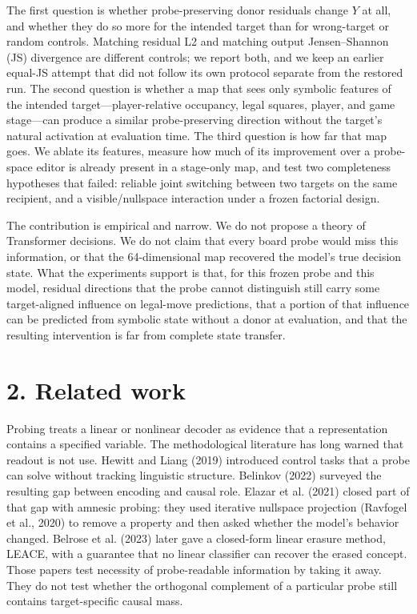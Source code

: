 \documentclass[11pt]{article}
\begin{document}
The first question is whether probe-preserving donor residuals change \(Y\) at all, and whether they do so more for the intended target than for wrong-target or random controls. Matching residual L2 and matching output Jensen--Shannon (JS) divergence are different controls; we report both, and we keep an earlier equal-JS attempt that did not follow its own protocol separate from the restored run. The second question is whether a map that sees only symbolic features of the intended target---player-relative occupancy, legal squares, player, and game stage---can produce a similar probe-preserving direction without the target's natural activation at evaluation time. The third question is how far that map goes. We ablate its features, measure how much of its improvement over a probe-space editor is already present in a stage-only map, and test two completeness hypotheses that failed: reliable joint switching between two targets on the same recipient, and a visible/nullspace interaction under a frozen factorial design.

The contribution is empirical and narrow. We do not propose a theory of Transformer decisions. We do not claim that every board probe would miss this information, or that the 64-dimensional map recovered the model's true decision state. What the experiments support is that, for this frozen probe and this model, residual directions that the probe cannot distinguish still carry some target-aligned influence on legal-move predictions, that a portion of that influence can be predicted from symbolic state without a donor at evaluation, and that the resulting intervention is far from complete state transfer.

\section{2. Related work}

Probing treats a linear or nonlinear decoder as evidence that a representation contains a specified variable. The methodological literature has long warned that readout is not use. Hewitt and Liang (2019) introduced control tasks that a probe can solve without tracking linguistic structure. Belinkov (2022) surveyed the resulting gap between encoding and causal role. Elazar et al. (2021) closed part of that gap with amnesic probing: they used iterative nullspace projection (Ravfogel et al., 2020) to remove a property and then asked whether the model's behavior changed. Belrose et al. (2023) later gave a closed-form linear erasure method, LEACE, with a guarantee that no linear classifier can recover the erased concept. Those papers test necessity of probe-readable information by taking it away. They do not test whether the orthogonal complement of a particular probe still contains target-specific causal mass.
\end{document}
